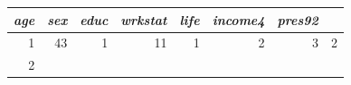 \documentclass[11pt,a4paper,openany]{book}
\begin{document}
\begin{longtable}[]{@{}rrrrrrrr@{}}
\begin{minipage}[b]{0.08\columnwidth}
\emph{age}\strut
\end{minipage} & \begin{minipage}[b]{0.08\columnwidth}\raggedleft\strut
\emph{sex}\strut
\end{minipage} & \begin{minipage}[b]{0.09\columnwidth}\raggedleft\strut
\emph{educ}\strut
\end{minipage} & \begin{minipage}[b]{0.12\columnwidth}\raggedleft\strut
\emph{wrkstat}\strut
\end{minipage} & \begin{minipage}[b]{0.09\columnwidth}\raggedleft\strut
\emph{life}\strut
\end{minipage} & \begin{minipage}[b]{0.12\columnwidth}\raggedleft\strut
\emph{income4}\strut
\end{minipage} & \begin{minipage}[b]{0.12\columnwidth}\raggedleft\strut
\emph{pres92}\strut
\end{minipage}\tabularnewline
\midrule
\endhead
\begin{minipage}[t]{0.07\columnwidth}\raggedleft\strut
1\strut
\end{minipage} & \begin{minipage}[t]{0.08\columnwidth}\raggedleft\strut
43\strut
\end{minipage} & \begin{minipage}[t]{0.08\columnwidth}\raggedleft\strut
1\strut
\end{minipage} & \begin{minipage}[t]{0.09\columnwidth}\raggedleft\strut
11\strut
\end{minipage} & \begin{minipage}[t]{0.12\columnwidth}\raggedleft\strut
1\strut
\end{minipage} & \begin{minipage}[t]{0.09\columnwidth}\raggedleft\strut
2\strut
\end{minipage} & \begin{minipage}[t]{0.12\columnwidth}\raggedleft\strut
3\strut
\end{minipage} & \begin{minipage}[t]{0.12\columnwidth}\raggedleft\strut
2\strut
\end{minipage}\tabularnewline
\begin{minipage}[t]{0.07\columnwidth}\raggedleft\strut
2\strut
\end{minipage} & \begin{minipage}[t]{0.08\columnwidth}\raggedleft\strut

\end{minipage}
\end{longtable}
\end{document}
